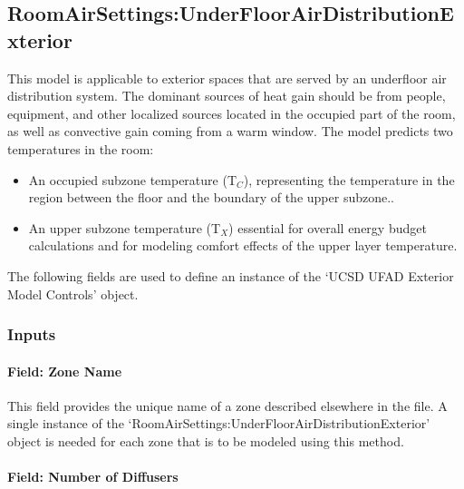 \subsection{RoomAirSettings:UnderFloorAirDistributionExterior}\label{roomairsettingsunderfloorairdistributionexterior}

This model is applicable to exterior spaces that are served by an underfloor air distribution system. The dominant sources of heat gain should be from people, equipment, and other localized sources located in the occupied part of the room, as well as convective gain coming from a warm window. The model predicts two temperatures in the room:

\begin{itemize}
\item
  An occupied subzone temperature (T\(_{C}\)), representing the temperature in the region between the floor and the boundary of the upper subzone..
\item
  An upper subzone temperature (T\(_{X}\)) essential for overall energy budget calculations and for modeling comfort effects of the upper layer temperature.
\end{itemize}

The following fields are used to define an instance of the `UCSD UFAD Exterior Model Controls' object.

\subsubsection{Inputs}\label{inputs-11-016}

\paragraph{Field: Zone Name}\label{field-zone-name-7-003}

This field provides the unique name of a zone described elsewhere in the file. A single instance of the `RoomAirSettings:UnderFloorAirDistributionExterior' object is needed for each zone that is to be modeled using this method.

\paragraph{Field: Number of Diffusers}\label{field-number-of-diffusers-1}


